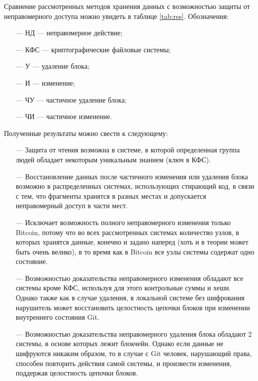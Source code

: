 Сравнение рассмотренных методов хранения данных с возможностью защиты от неправомерного доступа можно увидеть в таблице \ref{tab:res}. Обозначения:
\begin{itemize}
    \item[---] НД --- неправомерное действие;
    \item[---] КФС --- криптографические файловые системы;
    \item[---] У --- удаление блока;
    \item[---] И --- изменение;
    \item[---] ЧУ --- частичное удаление блока;
    \item[---] ЧИ --- частичное изменение.
\end{itemize}

Полученные результаты можно свести к следующему:
\begin{itemize}
    \item[---] Защита от чтения возможна в системе, в которой определенная группа людей обладает некоторым уникальным знанием (ключ в КФС).
    \item[---] Восстановление данных после частичного изменения или удаления блока возможно в распределенных системах, использующих стирающий код, в связи с тем, что фрагменты хранятся в разных местах и допускается неправомерный доступ в части мест.
    \item[---] Исключает возможность полного неправомерного изменения только Bitcoin, потому что во всех рассмотренных системах количество узлов, в которых хранятся данные, конечно и задано наперед (хоть и в теории может быть очень велико), в то время как в Bitcoin все узлы системы содержат одно состояние.
    \item[---] Возможностью доказательства неправомерного изменения обладают все системы кроме КФС, используя для этого контрольные суммы и хеши. Однако также как в случае удаления, в локальной системе без шифрования нарушитель может восстановить целостность цепочки блоков при изменении внутреннего состояния Git.
    \item[---] Возможностью доказательства неправомерного удаления блока обладают 2 системы, в основе которых лежит блокчейн. Однако если данные не шифруются никаким образом, то в случае с Git человек, нарушающий права, способен повторить действия самой системы, и произвести изменения, поддержав целостность цепочки блоков.
\end{itemize}

